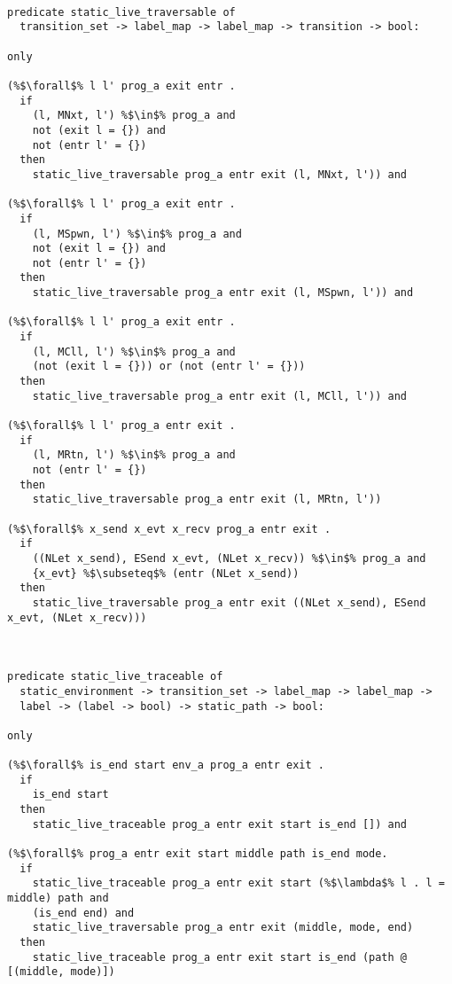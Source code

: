 \documentclass{article}
\begin{document}
\begin{lstlisting}[language=logic, escapechar=\%]

predicate static_live_traversable of
  transition_set -> label_map -> label_map -> transition -> bool:

only

(%$\forall$% l l' prog_a exit entr . 
  if
    (l, MNxt, l') %$\in$% prog_a and
    not (exit l = {}) and
    not (entr l' = {})
  then
    static_live_traversable prog_a entr exit (l, MNxt, l')) and

(%$\forall$% l l' prog_a exit entr .
  if
    (l, MSpwn, l') %$\in$% prog_a and 
    not (exit l = {}) and
    not (entr l' = {})
  then
    static_live_traversable prog_a entr exit (l, MSpwn, l')) and

(%$\forall$% l l' prog_a exit entr .
  if
    (l, MCll, l') %$\in$% prog_a and
    (not (exit l = {})) or (not (entr l' = {}))
  then
    static_live_traversable prog_a entr exit (l, MCll, l')) and

(%$\forall$% l l' prog_a entr exit .
  if
    (l, MRtn, l') %$\in$% prog_a and
    not (entr l' = {})
  then
    static_live_traversable prog_a entr exit (l, MRtn, l'))

(%$\forall$% x_send x_evt x_recv prog_a entr exit .
  if
    ((NLet x_send), ESend x_evt, (NLet x_recv)) %$\in$% prog_a and 
    {x_evt} %$\subseteq$% (entr (NLet x_send))
  then
    static_live_traversable prog_a entr exit ((NLet x_send), ESend x_evt, (NLet x_recv)))



predicate static_live_traceable of
  static_environment -> transition_set -> label_map -> label_map ->
  label -> (label -> bool) -> static_path -> bool:

only

(%$\forall$% is_end start env_a prog_a entr exit .
  if
    is_end start
  then
    static_live_traceable prog_a entr exit start is_end []) and

(%$\forall$% prog_a entr exit start middle path is_end mode. 
  if
    static_live_traceable prog_a entr exit start (%$\lambda$% l . l = middle) path and 
    (is_end end) and
    static_live_traversable prog_a entr exit (middle, mode, end) 
  then
    static_live_traceable prog_a entr exit start is_end (path @ [(middle, mode)])

  \end{lstlisting}
\end{document}
